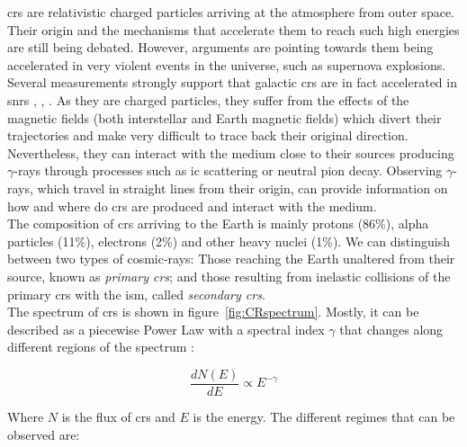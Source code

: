 \documentclass[main.tex]{subfiles}
\begin{document}
\glspl{cr} are relativistic charged particles arriving at the atmosphere from outer space. Their origin and the mechanisms that accelerate them to reach such high energies are still being debated. However, arguments are pointing towards them being accelerated in very violent events in the universe, such as supernova explosions. Several measurements strongly support that galactic \glspl{cr} are in fact accelerated in \glspl{snr} \cite{2014CRinSNR}, \cite{2013CRinSNR}, \cite{2012CRinSNR}. As they are charged particles, they suffer from the effects of the magnetic fields (both interstellar and Earth magnetic fields) which divert their trajectories and make very difficult to trace back their original direction. Nevertheless, they can interact with the medium close to their sources producing $\gamma$-rays through processes such as \gls{ic} scattering or neutral pion decay. Observing $\gamma$-rays, which travel in straight lines from their origin, can provide information on how and where do \glspl{cr} are produced and interact with the medium.\\
The composition of \glspl{cr} arriving to the Earth is mainly protons (86\%), alpha particles (11\%), electrons (2\%) and other heavy nuclei (1\%). We can distinguish between two types of cosmic-rays: Those reaching the Earth unaltered from their source, known as \textit{primary \glspl{cr}}; and those resulting from inelastic collisions of the primary \glspl{cr} with the \gls{ism}, called \textit{secondary \glspl{cr}}.\\
The spectrum of \glspl{cr} is shown in figure~\ref{fig:CRspectrum}. Mostly, it can be described as a piecewise Power Law with a spectral index $\gamma$ that changes along different regions of the spectrum \cite{2016CRSpectrum}:

\begin{equation}
    \frac{dN(E)}{dE} \propto E^{-\gamma}
\end{equation}

Where $N$ is the flux of \glspl{cr} and $E$ is the energy. The different regimes that can be observed are:
\end{document}
